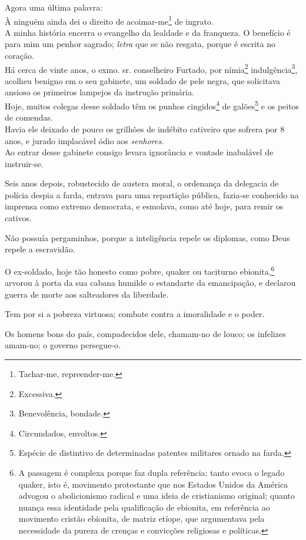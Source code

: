 Agora uma última palavra:\\
À ninguém ainda dei o direito de acoimar-me\footnote{Tachar-me,
  repreender-me.} de ingrato.\\
A minha história encerra o evangelho da lealdade e da franqueza. O
benefício é para mim um penhor sagrado; \emph{letra} que se não resgata,
porque é escrita no coração.\\
Há cerca de vinte anos, o exmo. sr. conselheiro Furtado, por
nímia\footnote{Excessiva.} indulgência\footnote{Benevolência,
  bondade.}, acolheu benigno em o seu gabinete, um soldado de pele
negra, que solicitava ansioso os primeiros lampejos da instrução
primária.\\
Hoje, muitos colegas desse soldado têm os punhos cingidos\footnote{
  Circundados, envoltos.} de galões\footnote{Espécie de distintivo de
  determinadas patentes militares ornado na farda.} e os peitos de
comendas.\\
Havia ele deixado de pouco os grilhões de indébito cativeiro que sofrera
por 8 anos, e jurado implacável ódio aos \emph{senhores}.\\
Ao entrar desse gabinete consigo levara ignorância e vontade inabalável
de instruir-se.

Seis anos depois, robustecido de austera moral, o ordenança da delegacia
de polícia despia a farda, entrava para uma repartição pública, fazia-se
conhecido na imprensa como extremo democrata, e esmolava, como até hoje,
para remir os cativos.

Não possuía pergaminhos, porque a inteligência repele os diplomas, como
Deus repele a escravidão.

O ex-soldado, hoje tão honesto como pobre, quaker ou taciturno
ebionita,\footnote{A passagem é complexa porque faz dupla referência:
  tanto evoca o legado quaker, isto é, movimento protestante que nos
  Estados Unidos da América advogou o abolicionismo radical e uma ideia
  de cristianismo original; quanto nuança essa identidade pela
  qualificação de ebionita, em referência ao movimento cristão ebionita,
  de matriz etíope, que argumentava pela necessidade da pureza de
  crenças e convicções religiosas e políticas.} arvorou à porta da sua
cabana humilde o estandarte da emancipação, e declarou guerra de morte
aos salteadores da liberdade.

Tem por si a pobreza virtuosa; combate contra a imoralidade e o poder.

Os homens bons do país, compadecidos dele, chamam-no de louco; os
infelizes amam-no; o governo persegue-o.

